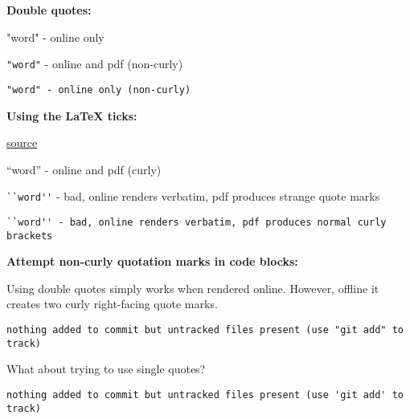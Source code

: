 \textbf{Double quotes:}

"word" - online only

\verb|"word"| - online and pdf (non-curly)

\begin{lstlisting}
"word" - online only (non-curly)
\end{lstlisting}

\textbf{Using the LaTeX ticks:}

\href{http://www.maths.tcd.ie/~dwilkins/LaTeXPrimer/QuotDash.html}{source}

``word'' - online and pdf (curly)

\verb|``word''| - bad, online renders verbatim, pdf produces strange quote marks

\begin{lstlisting}
``word'' - bad, online renders verbatim, pdf produces normal curly brackets
\end{lstlisting}

\textbf{Attempt non-curly quotation marks in code blocks:}

Using double quotes simply works when rendered online.
However, offline it creates two curly right-facing quote marks.

\begin{lstlisting}
nothing added to commit but untracked files present (use "git add" to track)
\end{lstlisting}

What about trying to use single quotes?

\begin{lstlisting}
nothing added to commit but untracked files present (use 'git add' to track)
\end{lstlisting}
